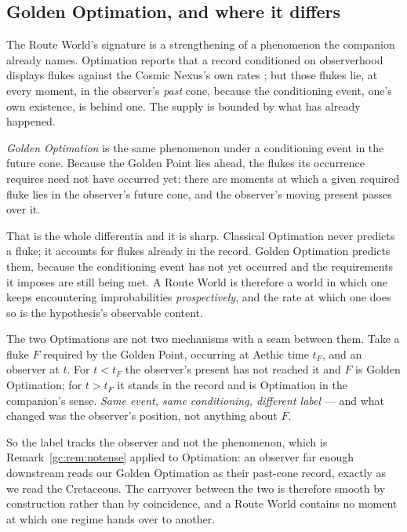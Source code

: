 \subsection{Golden Optimation, and where it differs}\label{gc:sub:goldenopt}

The Route World's
signature is a strengthening of a phenomenon the companion already
names. Optimation reports that a record conditioned on observerhood
displays flukes against the Cosmic Nexus's own rates \cite{Nexus}; but
those flukes lie, at every moment, in the observer's \emph{past} cone,
because the conditioning event, one's own existence, is behind one.
The supply is bounded by what has already happened.

\begin{definition}\label{gc:def:goldenopt}
\emph{Golden Optimation} is the same phenomenon under a conditioning
event in the future cone. Because the Golden Point lies ahead, the
flukes its occurrence requires need not have occurred yet: there are
moments at which a given required fluke lies in the observer's future
cone, and the observer's moving present passes over it.
\end{definition}

That is the whole differentia and it is sharp. Classical Optimation
never predicts a fluke; it accounts for flukes already in the record.
Golden Optimation predicts them, because the conditioning event has not
yet occurred and the requirements it imposes are still being met. A
Route World is therefore a world in which one keeps encountering
improbabilities \emph{prospectively}, and the rate at which one does so
is the hypothesis's observable content.

\begin{remark}
\label{gc:rem:carryover}
The two Optimations are not two mechanisms with a seam between them.
Take a fluke $F$ required by the Golden Point, occurring at Aethic time
$t_F$, and an observer at $t$. For $t<t_F$ the observer's present has not
reached it and $F$ is Golden Optimation; for $t>t_F$ it stands in the
record and is Optimation in the companion's sense. \emph{Same event, same
conditioning, different label} --- and what changed was the observer's
position, not anything about $F$.

So the label tracks the observer and not the phenomenon, which is
Remark~\ref{gc:rem:notense} applied to Optimation: an observer far enough
downstream reads our Golden Optimation as their past-cone record,
exactly as we read the Cretaceous. The carryover between the two is
therefore smooth by construction rather than by coincidence, and a Route
World contains no moment at which one regime hands over to another.
\end{remark}

